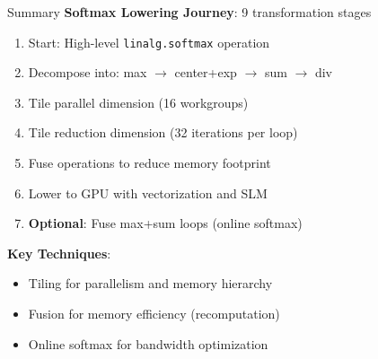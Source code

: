 \documentclass[aspectratio=169]{beamer}
\begin{document}
\begin{frame}{Summary}
\textbf{Softmax Lowering Journey}: 9 transformation stages

\begin{enumerate}
\item Start: High-level \texttt{linalg.softmax} operation
\item Decompose into: max $\rightarrow$ center+exp $\rightarrow$ sum $\rightarrow$ div
\item Tile parallel dimension (16 workgroups)
\item Tile reduction dimension (32 iterations per loop)
\item Fuse operations to reduce memory footprint
\item Lower to GPU with vectorization and SLM
\item \textbf{Optional}: Fuse max+sum loops (online softmax)
\end{enumerate}

\vspace{0.5cm}

\textbf{Key Techniques}:
\begin{itemize}
\item Tiling for parallelism and memory hierarchy
\item Fusion for memory efficiency (recomputation)
\item Online softmax for bandwidth optimization
\end{itemize}
\end{frame}
\end{document}
